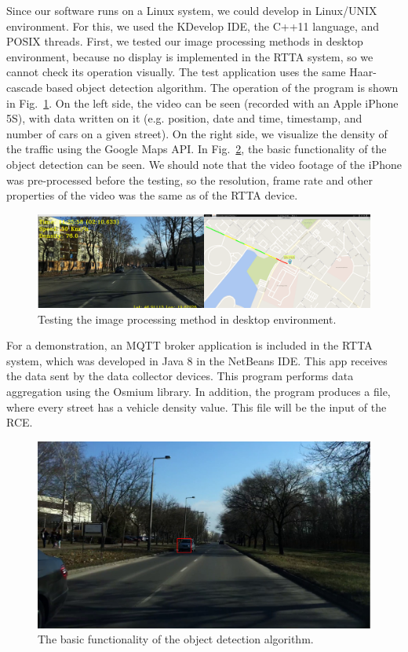 \documentclass[b5paper,12pt]{report}
\theoremstyle{definition}
\begin{document}
Since our software runs on a Linux system, we could develop in Linux/UNIX environment. For this, we used the KDevelop IDE, the C++11 language, and POSIX threads. First, we tested our image processing methods in desktop environment, because no display is implemented in the RTTA system, so we cannot check its operation visually. The test application uses the same Haar-cascade based object detection algorithm. The operation of the program is shown in Fig.~\ref{rttapc}. On the left side, the video can be seen (recorded with an Apple iPhone 5S), with data written on it (e.g. position, date and time, timestamp, and number of cars on a given street). On the right side, we visualize the density of the traffic using the Google Maps API. In Fig.~\ref{carredrect}, the basic functionality of the object detection can be seen. We should note that the video footage of the iPhone was pre-processed before the testing, so the resolution, frame rate and other properties of the video was the same as of the RTTA device.

\begin{figure}[ht]
\centerline{
\includegraphics[width=12.6cm]{img/rttapc.png}}
\caption{Testing the image processing method in desktop environment.}
\label{rttapc}
\end{figure}

For a demonstration, an MQTT broker application is included in the RTTA system, which was developed in Java 8 in the NetBeans IDE. This app receives the data sent by the data collector devices. This program performs data aggregation using the Osmium library. In addition, the program produces a file, where every street has a vehicle density value. This file will be the input of the RCE.

\begin{figure}[ht]
\centerline{
\includegraphics[width=12.6cm]{img/carredrect.png}}
\caption{The basic functionality of the object detection algorithm.}
\label{carredrect}
\end{figure}
\end{document}
